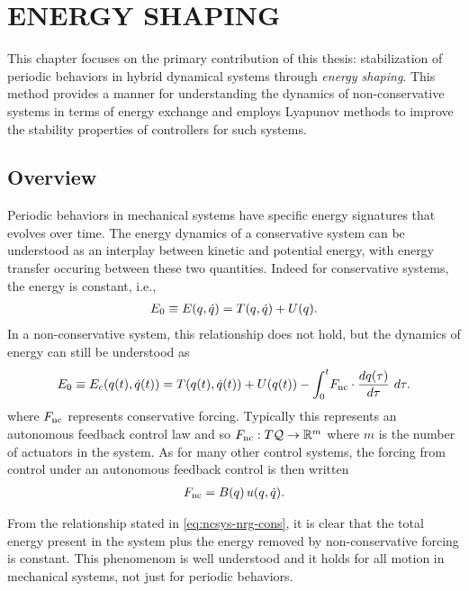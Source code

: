 \chapter{\uppercase{Energy Shaping}}

This chapter focuses on the primary contribution of this thesis: stabilization of periodic behaviors in hybrid dynamical systems through {\em energy shaping}.
%
This method provides a manner for understanding the dynamics of non-conservative systems in terms of energy exchange and employs Lyapunov methods to improve the stability properties of controllers for such systems.
%

\section{Overview}

Periodic behaviors in mechanical systems have specific energy signatures that evolves over time.
%
The energy dynamics of a conservative system can be understood as an interplay between kinetic and potential energy, with energy transfer occuring between these two quantities.
%
Indeed for conservative systems, the energy is constant, i.e.,
\begin{align}
  E_{0} \equiv E(q, \dot{q}) = T(q, \dot{q}) + U(q).
\end{align}
%
In a non-conservative system, this relationship does not hold, but the dynamics of energy can still be understood as
\begin{align}
  \label{eq:ncsys-nrg-cons}
  E_{0} \equiv E_{c}(q(t), \dot{q}(t)) = T(q(t), \dot{q}(t)) + U(q(t)) - \int_{0}^{t} \! F_{\mathrm{nc}} \cdot \frac{dq(\tau)}{d\tau} \ d\tau.
\end{align}
where $F_{\mathrm{nc}}$ represents conservative forcing. Typically this represents an autonomous feedback control law and so $F_{\mathrm{nc}} : T\mathcal{Q} \to \mathbb{R}^m$ where $m$ is the number of actuators in the system.
%
As for many other control systems, the forcing from control under an autonomous feedback control is then written
\begin{align}
  F_{\mathrm{nc}} = B(q) \, u(q, \dot{q}).
\end{align}

From the relationship stated in \eqref{eq:ncsys-nrg-cons}, it is clear that the total energy present in the system plus the energy removed by non-conservative forcing is constant.
%
This phenomenom is well understood and it holds for all motion in mechanical systems, not just for periodic behaviors.


